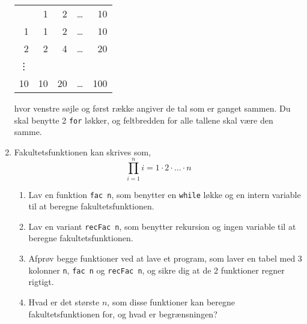 \documentclass[a4paper,12pt]{article}
\begin{document}
\begin{enumerate}[label=3ø.\arabic*,start=0]
\begin{center}
    \begin{tabular}{rrrrr}
      &1 & 2 & \dots & 10\\
      1 &1 & 2 & \dots & 10\\
      2 &2 & 4 & \dots & 20\\
      \vdots \\
      10 &10 & 20 & \dots & 100\\
    \end{tabular}
  \end{center}
hvor venstre søjle og først række angiver de tal som er ganget sammen. Du skal benytte 2 \lstinline!for! løkker, og feltbredden for alle tallene skal være den samme. 
\item Fakultetsfunktionen kan skrives som,
  \begin{equation}
    \prod_{i=1}^n i = 1\cdot 2\cdot \ldots \cdot n
  \end{equation}
  \begin{enumerate}
  \item Lav en funktion \lstinline!fac n!, som benytter en \lstinline!while! løkke og en intern variable til at beregne fakultetsfunktionen.
  \item Lav en variant \lstinline!recFac n!, som benytter rekursion og ingen variable til at beregne fakultetsfunktionen.
  \item Afprøv begge funktioner ved at lave et program, som laver en tabel med 3 kolonner \lstinline!n!, \lstinline!fac n! og \lstinline!recFac n!, og sikre dig at de 2 funktioner regner rigtigt.
  \item Hvad er det største $n$, som disse funktioner kan beregne fakultetsfunktionen for, og hvad er begrænsningen?
  \end{enumerate}
\end{enumerate}
\end{document}
